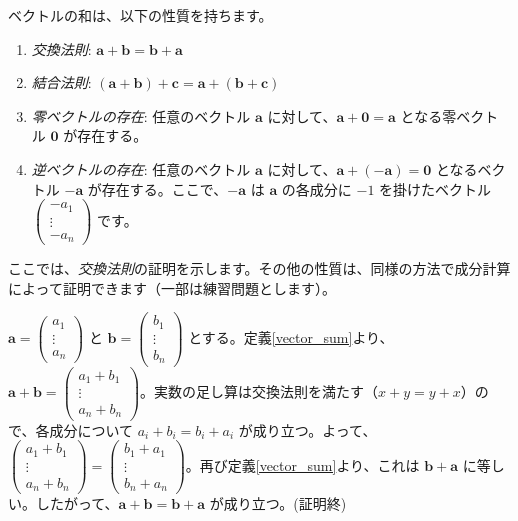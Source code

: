 \begin{thm}[ベクトルの和の性質] \label{vector_sum_property}
ベクトルの和は、以下の性質を持ちます。
\begin{enumerate}
\item \emph{交換法則}: $\bm{a} + \bm{b} = \bm{b} + \bm{a}$
\item \emph{結合法則}: $(\bm{a} + \bm{b}) + \bm{c} = \bm{a} + (\bm{b} + \bm{c})$
\item \emph{零ベクトルの存在}: 任意のベクトル $\bm{a}$ に対して、$\bm{a} + \bm{0} = \bm{a}$ となる零ベクトル $\bm{0}$ が存在する。
\item \emph{逆ベクトルの存在}: 任意のベクトル $\bm{a}$ に対して、$\bm{a} + (-\bm{a}) = \bm{0}$ となるベクトル $-\bm{a}$ が存在する。ここで、$-\bm{a}$ は $\bm{a}$ の各成分に $-1$ を掛けたベクトル $\begin{pmatrix} -a_1 \\ \vdots \\ -a_n \end{pmatrix}$ です。
\end{enumerate}
\begin{proof*}
ここでは、\emph{交換法則}の証明を示します。その他の性質は、同様の方法で成分計算によって証明できます（一部は練習問題とします）。\par
$\bm{a} = \begin{pmatrix} a_1 \\ \vdots \\ a_n \end{pmatrix}$ と $\bm{b} = \begin{pmatrix} b_1 \\ \vdots \\ b_n \end{pmatrix}$ とする。定義\ref{vector_sum}より、$\bm{a} + \bm{b} = \begin{pmatrix} a_1 + b_1 \\ \vdots \\ a_n + b_n \end{pmatrix}$。実数の足し算は交換法則を満たす（$x+y = y+x$）ので、各成分について $a_i + b_i = b_i + a_i$ が成り立つ。よって、$\begin{pmatrix} a_1 + b_1 \\ \vdots \\ a_n + b_n \end{pmatrix} = \begin{pmatrix} b_1 + a_1 \\ \vdots \\ b_n + a_n \end{pmatrix}$。再び定義\ref{vector_sum}より、これは $\bm{b} + \bm{a}$ に等しい。したがって、$\bm{a} + \bm{b} = \bm{b} + \bm{a}$ が成り立つ。(証明終)
\end{proof*}
\end{thm}

